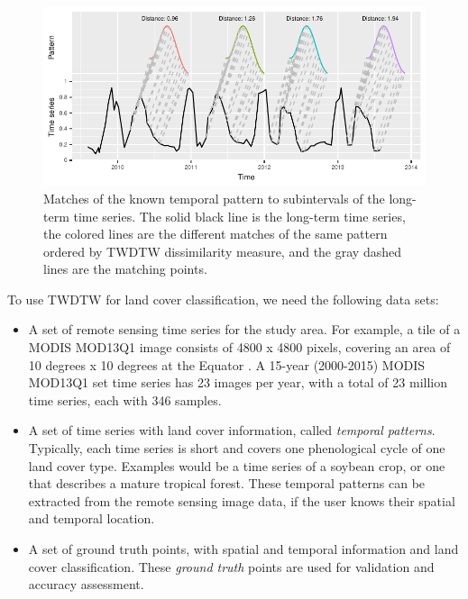 \documentclass[article,shortnames]{jss}
\begin{document}
\begin{CodeChunk}
\begin{figure}[h]

{\centering \includegraphics{applying_twdtw_files/figure-latex/twdtw-example-1} 

}

\caption[Matches of the known temporal pattern to subintervals of the long-term time series]{Matches of the known temporal pattern to subintervals of the long-term time series. The solid black line is the long-term time series, the colored lines are the different matches of the same pattern ordered by TWDTW dissimilarity measure, and the gray dashed lines are the matching points.}\label{fig:twdtw-example}
\end{figure}
\end{CodeChunk}

To use TWDTW for land cover classification, we need the following data
sets:

\begin{itemize}
\item
  A set of remote sensing time series for the study area. For example, a
  tile of a MODIS MOD13Q1 image consists of 4800 x 4800 pixels, covering
  an area of 10 degrees x 10 degrees at the Equator \citep{Friedl:2010}.
  A 15-year (2000-2015) MODIS MOD13Q1 set time series has 23 images per
  year, with a total of 23 million time series, each with 346 samples.
\item
  A set of time series with land cover information, called
  \emph{temporal patterns}. Typically, each time series is short and
  covers one phenological cycle of one land cover type. Examples would
  be a time series of a soybean crop, or one that describes a mature
  tropical forest. These temporal patterns can be extracted from the
  remote sensing image data, if the user knows their spatial and
  temporal location.
\item
  A set of ground truth points, with spatial and temporal information
  and land cover classification. These \emph{ground truth} points are
  used for validation and accuracy assessment.
\end{itemize}
\end{document}
